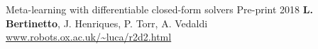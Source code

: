 


\begin{cvpapers}
  \cvpapertitle
    {Meta-learning with differentiable closed-form solvers} %
    {Pre-print} %
    {2018} %
  \cvpaperauthors
    {\textbf{L. Bertinetto}, J. Henriques, P. Torr, A. Vedaldi}
    {} %
    {} %
  \cvpaperurl
    {\href{http://www.robots.ox.ac.uk/~luca/r2d2.html}{www.robots.ox.ac.uk/\textasciitilde luca/r2d2.html}}
    {} %
    {} %


\end{cvpapers}
